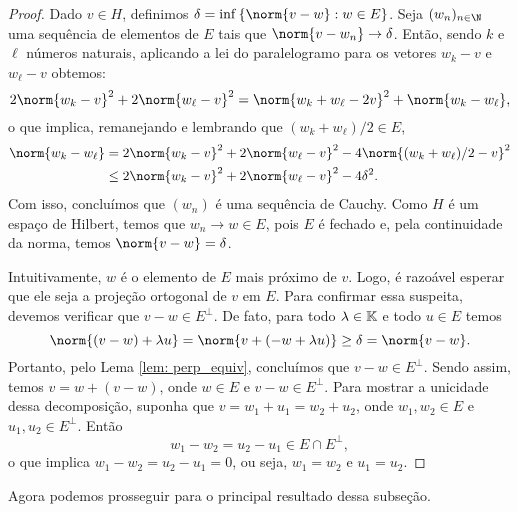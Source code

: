 \begin{proof}
    Dado \( v \in H \), definimos \( \delta = \inf \left\{ \norm{ v - w } : w \in E \right\} \).
    Seja \( (w_{ n })_{ n\in\N } \) uma sequência de elementos de \( E \) tais que \( \norm{ v - w_{ n } } \to \delta \).
    Então, sendo \( k \) e \( \ell \) números naturais, aplicando a lei do paralelogramo para os vetores \( w_{ k } - v \) e \( w_{ \ell } - v \) obtemos: \[
        2 \norm{ w_{ k } - v }^2 + 2 \norm{ w_{ \ell } - v }^2
        = \norm{ w_{ k } + w_{ \ell } - 2v }^2 + \norm{ w_{ k } - w_{ \ell } }
    ,\]
    o que implica, remanejando e lembrando que \( (w_{ k } + w_{ \ell })/2 \in E \),
    \begin{align*}
        \norm{ w_{ k } - w_{ \ell } }
        &= 2 \norm{ w_{ k } - v }^2 + 2 \norm{ w_{ \ell } - v }^2 - 4 \norm{ (w_{ k } + w_{ \ell })/2 - v }^2 \\
        &\leq 2 \norm{ w_{ k } - v }^2 + 2 \norm{ w_{ \ell } - v }^2 - 4 \delta^2
    .\end{align*}
    Com isso, concluímos que \( (w_{ n }) \) é uma sequência de Cauchy.
    Como \( H \) é um espaço de Hilbert, temos que \( w_{ n } \to w \in E \), pois \( E \) é fechado e, pela continuidade da norma, temos \( \norm{ v - w } = \delta \).

    Intuitivamente, \( w \) é o elemento de \( E \) mais próximo de \( v \).
    Logo, é razoável esperar que ele seja a projeção ortogonal de \( v \) em \( E \).
    Para confirmar essa suspeita, devemos verificar que \( v - w \in E^{ \perp } \).
    De fato, para todo \( \lambda \in \mathbb{K} \) e todo \( u \in E \) temos \[
        \norm{ (v - w) + \lambda u }
        = \norm{ v + (-w + \lambda u) }
        \geq \delta
        = \norm{ v - w }
    .\]
    Portanto, pelo Lema \ref{lem: perp_equiv}, concluímos que \( v - w \in E^{ \perp } \).
    Sendo assim, temos \( v = w + (v - w) \), onde \( w \in E \) e \( v - w \in E^{ \perp } \).
    Para mostrar a unicidade dessa decomposição, suponha que \( v = w_{ 1 } + u_{ 1 } = w_{ 2 } + u_{ 2 } \), onde \( w_{ 1 }, w_{ 2 } \in E \) e \( u_{ 1 }, u_{ 2 } \in E^{ \perp } \).
    Então \[
        w_{ 1 } - w_{ 2 } = u_{ 2 } - u_{ 1 } \in E \cap E^{ \perp }
    ,\]
    o que implica \( w_{ 1 } - w_{ 2 } = u_{ 2 } - u_{ 1 } = 0 \), ou seja, \( w_{ 1 } = w_{ 2 } \) e \( u_{ 1 } = u_{ 2 } \).
\end{proof}

Agora podemos prosseguir para o principal resultado dessa subseção.

